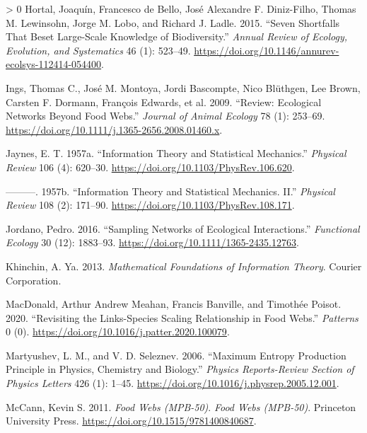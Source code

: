 \documentclass[10pt,oneside]{article}
\newlength{\cslhangindent}
\newenvironment{CSLReferences}[3] %
 {%
  \setlength{\parindent}{0pt}
  \ifodd #1 \everypar{\setlength{\hangindent}{\cslhangindent}}\ignorespaces\fi
  \ifnum #2 > 0
  \setlength{\parskip}{#2\baselineskip}
  \fi
 }%
 {}
\begin{document}
\begin{CSLReferences}{1}{0}
\leavevmode\hypertarget{ref-Hortal2015SevSho}{}%
Hortal, Joaquín, Francesco de Bello, José Alexandre F. Diniz-Filho,
Thomas M. Lewinsohn, Jorge M. Lobo, and Richard J. Ladle. 2015. {``Seven
Shortfalls That Beset Large-Scale Knowledge of Biodiversity.''}
\emph{Annual Review of Ecology, Evolution, and Systematics} 46 (1):
523--49. \url{https://doi.org/10.1146/annurev-ecolsys-112414-054400}.

\leavevmode\hypertarget{ref-Ings2009RevEco}{}%
Ings, Thomas C., José M. Montoya, Jordi Bascompte, Nico Blüthgen, Lee
Brown, Carsten F. Dormann, François Edwards, et al. 2009. {``Review:
Ecological Networks Beyond Food Webs.''} \emph{Journal of Animal
Ecology} 78 (1): 253--69.
\url{https://doi.org/10.1111/j.1365-2656.2008.01460.x}.

\leavevmode\hypertarget{ref-Jaynes1957InfThe}{}%
Jaynes, E. T. 1957a. {``Information Theory and Statistical Mechanics.''}
\emph{Physical Review} 106 (4): 620--30.
\url{https://doi.org/10.1103/PhysRev.106.620}.

\leavevmode\hypertarget{ref-Jaynes1957InfThea}{}%
---------. 1957b. {``Information Theory and Statistical Mechanics.
II.''} \emph{Physical Review} 108 (2): 171--90.
\url{https://doi.org/10.1103/PhysRev.108.171}.

\leavevmode\hypertarget{ref-Jordano2016SamNeta}{}%
Jordano, Pedro. 2016. {``Sampling Networks of Ecological
Interactions.''} \emph{Functional Ecology} 30 (12): 1883--93.
\url{https://doi.org/10.1111/1365-2435.12763}.

\leavevmode\hypertarget{ref-Khinchin2013MatFou}{}%
Khinchin, A. Ya. 2013. \emph{Mathematical Foundations of Information
Theory}. Courier Corporation.

\leavevmode\hypertarget{ref-MacDonald2020RevLin}{}%
MacDonald, Arthur Andrew Meahan, Francis Banville, and Timothée Poisot.
2020. {``Revisiting the Links-Species Scaling Relationship in Food
Webs.''} \emph{Patterns} 0 (0).
\url{https://doi.org/10.1016/j.patter.2020.100079}.

\leavevmode\hypertarget{ref-Martyushev2006MaxEnt}{}%
Martyushev, L. M., and V. D. Seleznev. 2006. {``Maximum Entropy
Production Principle in Physics, Chemistry and Biology.''} \emph{Physics
Reports-Review Section of Physics Letters} 426 (1): 1--45.
\url{https://doi.org/10.1016/j.physrep.2005.12.001}.

\leavevmode\hypertarget{ref-McCann2011FooWeb}{}%
McCann, Kevin S. 2011. \emph{Food Webs (MPB-50)}. \emph{Food Webs
(MPB-50)}. Princeton University Press.
\url{https://doi.org/10.1515/9781400840687}.


\end{CSLReferences}
\end{document}
